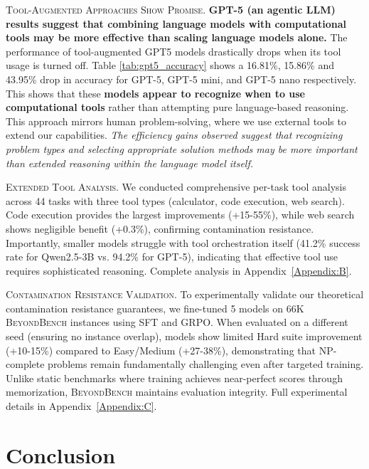 \documentclass{article} %
\theoremstyle{plain}
\theoremstyle{definition}
\newcommand{\our}{\textsc{BeyondBench}\xspace}
\newcommand{\rebuttal}[1]{{\color{RebuttalGreen}#1}}
\begin{document}
\textsc{Tool-Augmented Approaches Show Promise.} \textbf{GPT-5 (an agentic LLM) results suggest that combining language models with computational tools may be more effective than scaling language models alone.} The performance of tool-augmented GPT5 models drastically drops when its tool usage is turned off. Table \ref{tab:gpt5_accuracy} shows a 16.81\%, 15.86\% and 43.95\% drop in accuracy for GPT-5, GPT-5 mini, and GPT-5 nano respectively. This shows that these \textbf{models appear to recognize when to use computational tools} rather than attempting pure language-based reasoning. This approach mirrors human problem-solving, where we use external tools to extend our capabilities. \textit{The efficiency gains observed suggest that recognizing problem types and selecting appropriate solution methods may be more important than extended reasoning within the language model itself.}

\rebuttal{\textsc{Extended Tool Analysis.} We conducted comprehensive per-task tool analysis across 44 tasks with three tool types (calculator, code execution, web search). Code execution provides the largest improvements (+15-55\%), while web search shows negligible benefit (+0.3\%), confirming contamination resistance. Importantly, smaller models struggle with tool orchestration itself (41.2\% success rate for Qwen2.5-3B vs. 94.2\% for GPT-5), indicating that effective tool use requires sophisticated reasoning. Complete analysis in Appendix~\ref{Appendix:B}.}

\rebuttal{\textsc{Contamination Resistance Validation.} To experimentally validate our theoretical contamination resistance guarantees, we fine-tuned 5 models on 66K \our instances using SFT and GRPO. When evaluated on a different seed (ensuring no instance overlap), models show limited Hard suite improvement (+10-15\%) compared to Easy/Medium (+27-38\%), demonstrating that NP-complete problems remain fundamentally challenging even after targeted training. Unlike static benchmarks where training achieves near-perfect scores through memorization, \our maintains evaluation integrity. Full experimental details in Appendix~\ref{Appendix:C}.}



\section{Conclusion}
\end{document}
